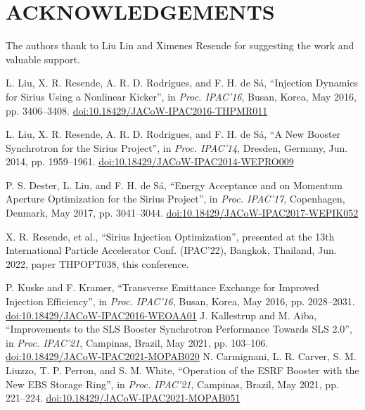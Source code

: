 \documentclass[a4paper,
               keeplastbox,   %
              nospread,     %
               ]{jacow}
\begin{document}
\section{ACKNOWLEDGEMENTS}
The authors thank to Liu Lin and Ximenes Resende for suggesting the work and valuable support.
%
%
{}%
	{\printbibliography}%
	{%
	
	\begin{thebibliography}{99}   %
	
  L. Liu, X. R. Resende, A. R. D. Rodrigues, and F. H. de Sá,
  \textquotedblleft{Injection Dynamics for Sirius Using a Nonlinear Kicker}\textquotedblright,
  in \emph{Proc. IPAC’16}, Busan, Korea, May 2016, pp. 3406--3408.
  \url{doi:10.18429/JACoW-IPAC2016-THPMR011}
	
   L. Liu, X. R. Resende, A. R. D. Rodrigues, and F. H. de Sá,
   \textquotedblleft{A New Booster Synchrotron for the Sirius Project}\textquotedblright,
   in \emph{Proc. IPAC’14}, Dresden, Germany, Jun. 2014, pp. 1959--1961.
   \url{doi:10.18429/JACoW-IPAC2014-WEPRO009}            
	
   P. S. Dester, L. Liu, and F. H. de Sá,
   \textquotedblleft{Energy Acceptance and on Momentum Aperture Optimization for the Sirius Project}\textquotedblright,
   in \emph{Proc. IPAC’17}, Copenhagen, Denmark, May 2017, pp. 3041--3044.
   \url{doi:10.18429/JACoW-IPAC2017-WEPIK052}
   
 X. R. Resende, et al., \textquotedblleft{Sirius Injection Optimization}\textquotedblright,
  presented at the 13th International Particle Accelerator Conf. (IPAC’22), Bangkok, Thailand, Jun. 2022, paper THPOPT038, this conference.
   
  P. Kuske and F. Kramer,
  \textquotedblleft{Transverse Emittance Exchange for Improved Injection Efficiency}\textquotedblright,
  in \emph{Proc. IPAC’16}, Busan, Korea, May 2016, pp. 2028--2031.
  \url{doi:10.18429/JACoW-IPAC2016-WEOAA01}            
  J. Kallestrup and M. Aiba,
  \textquotedblleft{Improvements to the SLS Booster Synchrotron Performance Towards SLS 2.0}\textquotedblright,
  in \emph{Proc. IPAC’21}, Campinas, Brazil, May 2021, pp. 103--106.
  \url{doi:10.18429/JACoW-IPAC2021-MOPAB020}     
  N. Carmignani, L. R. Carver, S. M. Liuzzo, T. P. Perron, and S. M. White,
  \textquotedblleft{Operation of the ESRF Booster with the New EBS Storage Ring}\textquotedblright,
  in \emph{Proc. IPAC’21}, Campinas, Brazil, May 2021, pp. 221--224.
  \url{doi:10.18429/JACoW-IPAC2021-MOPAB051}  
	

\end{thebibliography}}
\end{document}
